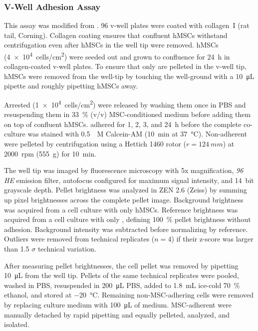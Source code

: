 \subsubsection*{V-Well Adhesion Assay}
This assay was modified from \cite{weetallHomogeneousFluorometricAssay2001}.
96 v-well plates were coated with collagen~I (rat tail, Corning). Collagen
coating ensures that confluent hMSCs withstand centrifugation even after hMSCs
in the well tip were removed. hMSCs (\SI{4e4}{cells/cm^2}) were seeded out and
grown to confluence for \SI{24}{\hour} in collagen-coated v-well plates. To
ensure that only \INA are pelleted in the v-well tip, hMSCs were removed from
the well-tip by touching the well-ground with a \SI{10}{\micro\liter} pipette
and roughly pipetting hMSCs away.

Arrested \INA (\SI{1e4}{cells/cm^2}) were released by washing them once in PBS
and resuspending them in \SI{33}{\percent} (v/v) MSC-conditioned medium before
adding them on top of confluent hMSCs. \INA adhered for 1, 2, 3, and
\SI{24}{\hour} before the complete co-culture was stained with \SI{0.5}{\micro
    M} Calcein-AM (\SI{10}{\minute} at \SI{37}{\degreeCelsius}). Non-adherent \INA
were pelleted by centrifugation using a Hettich 1460 rotor (\(r =
\SI{124}{mm}\)) at \SI{2000}{rpm} (\SI{555}{g}) for \SI{10}{\minute}.

The well tip was imaged by fluorescence microscopy with 5x magnification,
\textit{96 HE} emission filter, autofocus configured for maximum signal intensity,
 and \SI{14}{bit} grayscale depth. Pellet brightness was
analyzed in ZEN 2.6 (Zeiss) by summing up pixel brightnesses across the complete
pellet image. Background brightness was acquired from a cell culture with only
hMSCs. Reference brightness was acquired from a cell culture with only \INA,
defining \SI{100}{\percent} pellet brightness without adhesion. Background
intensity was subtracted before normalizing by reference. Outliers were removed
from technical replicates (\(n=4\)) if their z-score was larger than
1.5 $\sigma$ technical variation.

After measuring pellet brightnesses, the cell pellet was removed by pipetting
\SI{10}{\micro\liter} from the well tip. Pellets of the same technical
replicates were pooled, washed in PBS, resuspended in \SI{200}{\micro\liter}
PBS, added to \SI{1.8}{mL} ice-cold \SI{70}{\percent} ethanol, and stored at
\SI{-20}{\degreeCelsius}. Remaining non-MSC-adhering \INA cells were removed by
replacing culture medium with \SI{100}{\micro\liter} of medium. MSC-adherent
\INA were manually detached by rapid pipetting and equally pelleted, analyzed,
and isolated.

